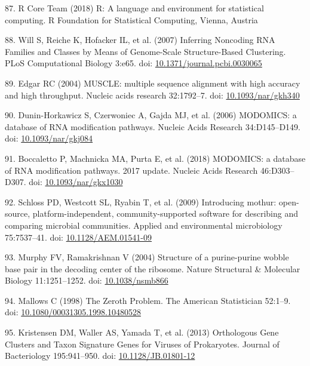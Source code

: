 \documentclass[12pt,twoside]{mitthesis-manusdown}
\begin{document}
\hypertarget{ref-RCore}{}
87. R Core Team (2018) R: A language and environment for statistical
computing. R Foundation for Statistical Computing, Vienna, Austria

\hypertarget{ref-Will2007}{}
88. Will S, Reiche K, Hofacker IL, et al. (2007) Inferring Noncoding RNA
Families and Classes by Means of Genome-Scale Structure-Based
Clustering. PLoS Computational Biology 3:e65. doi:
\href{https://doi.org/10.1371/journal.pcbi.0030065}{10.1371/journal.pcbi.0030065}

\hypertarget{ref-Edgar2004}{}
89. Edgar RC (2004) MUSCLE: multiple sequence alignment with high
accuracy and high throughput. Nucleic acids research 32:1792--7. doi:
\href{https://doi.org/10.1093/nar/gkh340}{10.1093/nar/gkh340}

\hypertarget{ref-Dunin-Horkawicz2006}{}
90. Dunin-Horkawicz S, Czerwoniec A, Gajda MJ, et al. (2006) MODOMICS: a
database of RNA modification pathways. Nucleic Acids Research
34:D145--D149. doi:
\href{https://doi.org/10.1093/nar/gkj084}{10.1093/nar/gkj084}

\hypertarget{ref-Boccaletto2018}{}
91. Boccaletto P, Machnicka MA, Purta E, et al. (2018) MODOMICS: a
database of RNA modification pathways. 2017 update. Nucleic Acids
Research 46:D303--D307. doi:
\href{https://doi.org/10.1093/nar/gkx1030}{10.1093/nar/gkx1030}

\hypertarget{ref-Schloss2009}{}
92. Schloss PD, Westcott SL, Ryabin T, et al. (2009) Introducing mothur:
open-source, platform-independent, community-supported software for
describing and comparing microbial communities. Applied and
environmental microbiology 75:7537--41. doi:
\href{https://doi.org/10.1128/AEM.01541-09}{10.1128/AEM.01541-09}

\hypertarget{ref-Murphy2004}{}
93. Murphy FV, Ramakrishnan V (2004) Structure of a purine-purine wobble
base pair in the decoding center of the ribosome. Nature Structural \&
Molecular Biology 11:1251--1252. doi:
\href{https://doi.org/10.1038/nsmb866}{10.1038/nsmb866}

\hypertarget{ref-Mallows1998}{}
94. Mallows C (1998) The Zeroth Problem. The American Statistician
52:1--9. doi:
\href{https://doi.org/10.1080/00031305.1998.10480528}{10.1080/00031305.1998.10480528}

\hypertarget{ref-Kristensen2013}{}
95. Kristensen DM, Waller AS, Yamada T, et al. (2013) Orthologous Gene
Clusters and Taxon Signature Genes for Viruses of Prokaryotes. Journal
of Bacteriology 195:941--950. doi:
\href{https://doi.org/10.1128/JB.01801-12}{10.1128/JB.01801-12}
\end{document}
